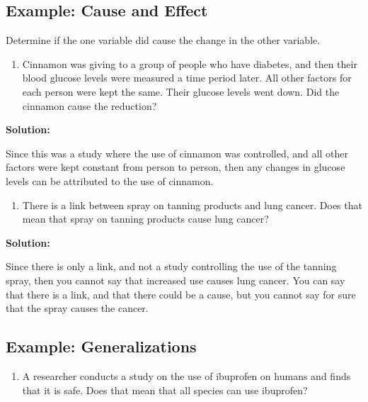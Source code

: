 \documentclass[]{book}
\providecommand{\tightlist}{%
  \setlength{\itemsep}{0pt}\setlength{\parskip}{0pt}}
\begin{document}
\hypertarget{example-cause-and-effect}{%
\subsection{Example: Cause and Effect}\label{example-cause-and-effect}}

Determine if the one variable did cause the change in the other
variable.

\begin{enumerate}
\def\labelenumi{\alph{enumi}.}
\tightlist
\item
  Cinnamon was giving to a group of people who have diabetes, and then their blood glucose levels were measured a time period later. All other factors for each person were kept the same. Their glucose levels went down. Did the cinnamon cause the reduction?
\end{enumerate}

\textbf{Solution:}

Since this was a study where the use of cinnamon was controlled, and all other factors were kept constant from person to person, then any changes in glucose levels can be attributed to the use of cinnamon.

\begin{enumerate}
\def\labelenumi{\alph{enumi}.}
\setcounter{enumi}{1}
\tightlist
\item
  There is a link between spray on tanning products and lung cancer. Does that mean that spray on tanning products cause lung cancer?
\end{enumerate}

\textbf{Solution:}

Since there is only a link, and not a study controlling the use of the tanning spray, then you cannot say that increased use causes lung cancer. You can say that there is a link, and that there could be a cause, but you cannot say for sure that the spray causes the cancer.

\hypertarget{example-generalizations}{%
\subsection{Example: Generalizations}\label{example-generalizations}}

\begin{enumerate}
\def\labelenumi{\alph{enumi}.}
\tightlist
\item
  A researcher conducts a study on the use of ibuprofen on humans and finds that it is safe. Does that mean that all species can use ibuprofen?
\end{enumerate}
\end{document}
